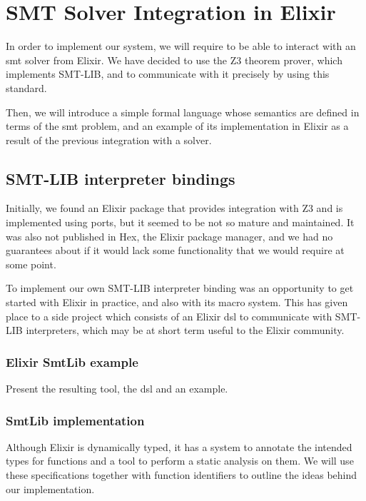 \chapter{SMT Solver Integration in Elixir}
\label{cap:smtSolverIntegration}

In order to implement our system, we will require to be able to interact with
an \acrshort{smt} solver from Elixir. We have decided to use the Z3 theorem
prover, which implements SMT-LIB, and to communicate with it precisely by using
this standard.

Then, we will introduce a simple formal language whose semantics are defined
in terms of the \gls{smt} problem, and an example of its implementation in 
Elixir as a result of the previous integration with a solver.

\section{SMT-LIB interpreter bindings}

Initially, we found an Elixir package that provides integration with Z3 and is
implemented using ports, but it seemed to be not so mature and maintained. It 
was also not published in Hex, the Elixir package manager, and we had no
guarantees about if it would lack some functionality that we would require at
some point.

To implement our own SMT-LIB interpreter binding was an opportunity to get
started with Elixir in practice, and also with its macro system. This has 
given place to a side project which consists of an Elixir \gls{dsl} to
communicate with SMT-LIB interpreters, which may be at short term useful to
the Elixir community.

\subsection{Elixir SmtLib example}

Present the resulting tool, the \gls{dsl} and an example.

\subsection{SmtLib implementation}

Although Elixir is dynamically typed, it has a system to annotate the intended
types for functions and a tool to perform a static analysis on them. We will
use these specifications together with function identifiers to outline the ideas
behind our implementation.

